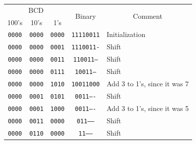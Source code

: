 \documentclass[12pt,a4paper,oneside]{book} %
\begin{document}
\begin{table}[H]
    \centering
    \begin{tabular}{|ccc|c|l|}
        \hline
        \multicolumn{3}{|c|}{BCD}                                      & \multirow{2}{*}{Binary} & \multicolumn{1}{c|}{\multirow{2}{*}{Comment}} \\ \cline{1-3}
        \multicolumn{1}{|c|}{100's} & \multicolumn{1}{c|}{10's} & 1's  &                         & \multicolumn{1}{c|}{}                       \\ \hline
        \multicolumn{1}{|c|}{\texttt{0000}}  & \multicolumn{1}{c|}{\texttt{0000}} & \texttt{0000} & \texttt{11110011}                & Initialization                              \\ \hline
        \multicolumn{1}{|c|}{\texttt{0000}}  & \multicolumn{1}{c|}{\texttt{0000}} & \texttt{0001} & \texttt{1110011-}                & Shift                                       \\ \hline
        \multicolumn{1}{|c|}{\texttt{0000}}  & \multicolumn{1}{c|}{\texttt{0000}} & \texttt{0011} & \texttt{110011--}                & Shift                                       \\ \hline
        \multicolumn{1}{|c|}{\texttt{0000}}  & \multicolumn{1}{c|}{\texttt{0000}} & \texttt{0111} & \texttt{10011---}                & Shift                                       \\ \hline
        \multicolumn{1}{|c|}{\texttt{0000}}  & \multicolumn{1}{c|}{\texttt{0000}} & \texttt{1010} & \texttt{10011000}                & Add 3 to 1's, since it was 7               \\ \hline
        \multicolumn{1}{|c|}{\texttt{0000}}  & \multicolumn{1}{c|}{\texttt{0001}} & \texttt{0101} & \texttt{0011----}                & Shift                                       \\ \hline
        \multicolumn{1}{|c|}{\texttt{0000}}  & \multicolumn{1}{c|}{\texttt{0001}} & \texttt{1000} & \texttt{0011----}                & Add 3 to 1's, since it was 5               \\ \hline
        \multicolumn{1}{|c|}{\texttt{0000}}  & \multicolumn{1}{c|}{\texttt{0011}} & \texttt{0000} & \texttt{011-----}                & Shift                                       \\ \hline
        \multicolumn{1}{|c|}{\texttt{0000}}  & \multicolumn{1}{c|}{\texttt{0110}} & \texttt{0000} & \texttt{11------}                & Shift                                       \\ \hline

\end{tabular}
\end{table}
\end{document}
